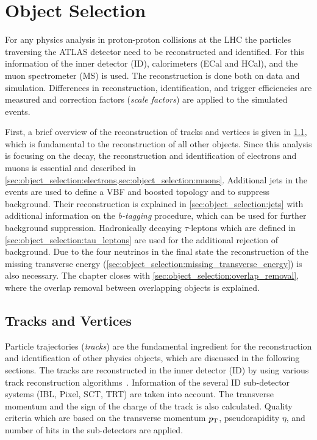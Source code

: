 \chapter{Object Selection}\label{cha:object_selection}

For any physics analysis in proton-proton collisions at the LHC the particles traversing the ATLAS detector
need to be reconstructed and identified.
For this information of the inner detector (ID), calorimeters (ECal and HCal), and the muon spectrometer (MS) is used. 
The reconstruction is done both on data and simulation. Differences in reconstruction, identification, and trigger efficiencies are
measured and correction factors (\emph{scale factors}) are applied to the simulated events.

First, a brief overview of the reconstruction of tracks and vertices is given in \cref{sec:object_selection:tracks_and_vertices}, which
is fundamental to the reconstruction of all other objects.
Since this analysis is focusing on the \Httllfull{} decay, the reconstruction and identification of electrons and muons
is essential and described in \cref{sec:object_selection:electrons,sec:object_selection:muons}.
Additional jets in the events are used to define a VBF and boosted topology  and to suppress background.
Their reconstruction is explained in \cref{sec:object_selection:jets} with additional information on the
\emph{b-tagging} procedure, which can be used for further background suppression.
Hadronically decaying $\tau$-leptons which are defined in \cref{sec:object_selection:tau_leptons} are used for the additional rejection of background.
Due to the four neutrinos in the final state the reconstruction of the missing transverse energy (\cref{sec:object_selection:missing_transverse_energy})
is also necessary.
The chapter closes with \cref{sec:object_selection:overlap_removal}, where the overlap removal between overlapping objects is explained.

\section{Tracks and Vertices}\label{sec:object_selection:tracks_and_vertices}

Particle trajectories (\emph{tracks}) are the fundamental ingredient for the reconstruction and identification
of other physics objects, which are discussed in the following sections.
The tracks are reconstructed in the inner detector (ID) by using various track reconstruction algorithms~\cite{ATL-SOFT-PUB-2007-007}.
Information of the several ID sub-detector systems (IBL, Pixel, SCT, TRT) are taken into account.
The transverse momentum and the sign of the charge of the track is also calculated.
Quality criteria which are based on the transverse momentum $p_\text{T}$, pseudorapidity $\eta$, and number of hits
in the sub-detectors are applied.

